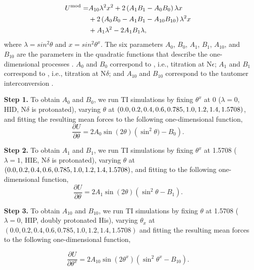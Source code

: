 \begin{align}
U^{\rm mod}= & A_{10}\lambda^{2}x^{2}+2\left(A_{1}B_{1}-A_{0}B_{0}\right)\lambda x \nonumber \\ & + 2\left(A_{0}B_{0}-A_{1}B_{1}-A_{10}B_{10}\right)\lambda^{2}x \nonumber \\ & + A_{1}\lambda^{2}-2A_{1}B_{1}\lambda,
\label{eq:PMF_his}
\end{align}
where $\lambda=sin^2\theta$ and $x=sin^2\theta^x$. 
The six parameters $A_{0}$, $B_{0}$, $A_{1}$,  $B_{1}$, $A_{10}$, and $B_{10}$ are the parameters
in the quadratic functions
that describe the one-dimensional processes
\cite{Khandogin_Brooks_2005_Biophys.J.}.
$A_0$ and $B_0$ correspond to ,
i.e., titration at N$\epsilon$;
$A_1$ and $B_1$ correspond to ,
i.e., titration at N$\delta$;
and $A_{10}$ and $B_{10}$ correspond to the tautomer interconversion .


\textbf{Step 1.}
To obtain $A_0$ and $B_0$, we 
run TI simulations by fixing
$\theta^{x}$ at 0 ($\lambda=0$, HID, N$\delta$ is protonated), varying
$\theta$ at $\left(0.0,0.2,0.4,0.6,\\
0.785,1.0,1.2,1.4,1.5708\right)$, and fitting
the resulting mean forces to the following one-dimensional function,
\begin{equation}
    \frac{\partial U}{\partial\theta}=2A_{0}\sin\left(2\theta\right)\left(\sin^{2}\theta)-B_{0}\right).
\end{equation}

\textbf{Step 2.}
To obtain $A_1$ and $B_1$,
we run TI simulations by fixing
$\theta^{x}$ at 1.5708 ($\lambda=1$, HIE, N$\delta$ is protonated), varying
$\theta$ at $\left(0.0,0.2,0.4,0.6,\\
0.785,1.0,1.2,1.4,1.5708\right)$, and 
fitting
 to the following one-dimensional function,
\begin{equation}
    \frac{\partial U}{\partial\theta}=2A_{1}\sin\left(2\theta\right)\left(\sin^{2}\theta-B_{1}\right).
\end{equation}

\textbf{Step 3.}
To obtain $A_{10}$ and $B_{10}$, we run TI simulations by fixing $\theta$ at 1.5708
($\lambda=0$, HIP, doubly protonated His),
varying $\theta_{x}$ at $\left(0.0,0.2,0.4,0.6,0.785,1.0,1.2,1.4,1.5708\right)$ 
and fitting the resulting mean forces
 to the following one-dimensional function,

\begin{equation}
    \frac{\partial U}{\partial\theta^{x}}=2A_{10}\sin\left(2\theta^{x}\right)\left(\sin^{2}\theta^{x}-B_{10}\right).
\end{equation}

